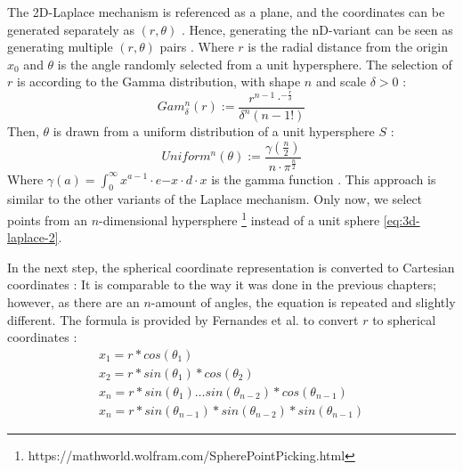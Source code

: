 The 2D-Laplace mechanism is referenced as a plane, and the coordinates can be generated separately as $(r, \theta)$ \citep{fernandes_generalised_2019,DBLP:journals/corr/abs-1212-1984}.
Hence, generating the nD-variant can be seen as generating multiple $(r, \theta)$ pairs \citep{fernandes_generalised_2019}.
Where $r$ is the radial distance from the origin $x_0$ and $\theta$ is the angle randomly selected from a unit hypersphere.
The selection of $r$ is according to the Gamma distribution, with shape $n$ and scale $\delta > 0$ \citep{fernandes_generalised_2019}:
\begin{equation}
  Gam^n_\delta(r) := \frac{r^{n-1}\cdot^{-\frac{r}{\delta}}}{\delta^n(n-1!)}
  \label{eq:generate_r_for_nd_laplace}
\end{equation}
Then, $\theta$ is drawn from a uniform distribution of a unit hypersphere $S$ \citep{fernandes_generalised_2019}:
\begin{equation}
  Uniform^n(\theta) := \frac{\gamma(\frac{n}{2})}{n \cdot \pi ^{\frac{n}{2}}}
  \label{eq:generate_theta_for_nd_laplace}
\end{equation}
Where $\gamma(a) = \int^\infty_0 x^{a-1} \cdot e{-x} \cdot d \cdot x$ is the gamma function \citep{fernandes_generalised_2019}.
This approach is similar to the other variants of the Laplace mechanism.
Only now, we select points from an $n$-dimensional hypersphere  \footnote{https://mathworld.wolfram.com/SpherePointPicking.html} instead of a unit sphere \ref{eq:3d-laplace-2}. \newline

In the next step, the spherical coordinate representation is converted to Cartesian coordinates \citep{fernandes_generalised_2019}:
It is comparable to the way it was done in the previous chapters; however, as there are an $n$-amount of angles, the equation is repeated and slightly different.
The formula is provided by Fernandes et al. to convert $r$ to spherical coordinates \citep{fernandes_generalised_2019}:
\begin{align}
  x_1 = r * cos (\theta_1)                                          \\
  x_2 = r * sin (\theta_1) * cos (\theta_2)                         \\
  x_{n} = r * sin(\theta_1) … sin(\theta_{n-2}) *cos (\theta_{n-1}) \\
  x_n = r * sin(\theta_{n-1}) * sin(\theta_{n-2}) * sin(\theta_{n-1})
  \label{eq:nd-laplace-cartesian}
\end{align}

